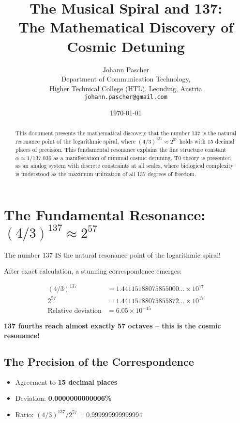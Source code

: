 \documentclass[12pt,a4paper]{article}
\title{The Musical Spiral and 137:\\
	The Mathematical Discovery of Cosmic Detuning}
\author{Johann Pascher\\
	Department of Communication Technology,\\
	Higher Technical College (HTL), Leonding, Austria\\
	\texttt{johann.pascher@gmail.com}}
\date{\today}
\begin{document}
	
	\maketitle
	
	\begin{abstract}
		This document presents the mathematical discovery that the number 137 is the natural resonance point of the logarithmic spiral, where $(4/3)^{137} \approx 2^{57}$ holds with 15 decimal places of precision. This fundamental resonance explains the fine structure constant $\alpha \approx 1/137.036$ as a manifestation of minimal cosmic detuning. T0 theory is presented as an analog system with discrete constraints at all scales, where biological complexity is understood as the maximum utilization of all 137 degrees of freedom.
	\end{abstract}
	
	\tableofcontents
	\newpage
	
	\section{The Fundamental Resonance: $(4/3)^{137} \approx 2^{57}$}
	
	The number 137 IS the natural resonance point of the logarithmic spiral!
	
	After exact calculation, a stunning correspondence emerges:
	
	\begin{align}
		(4/3)^{137} &= 1.44115188075855000... \times 10^{17}\\
		2^{57} &= 1.44115188075855872... \times 10^{17}\\
		\text{Relative deviation} &= 6.05 \times 10^{-15}
	\end{align}
	
	\textbf{137 fourths reach almost exactly 57 octaves -- this is the cosmic resonance!}
	
	\subsection{The Precision of the Correspondence}
	
	\begin{itemize}
		\item Agreement to \textbf{15 decimal places}
		\item Deviation: \textbf{0.0000000000006\%}
		\item Ratio: $(4/3)^{137} / 2^{57} = 0.999999999999994$
	\end{itemize}
	
\end{document}
